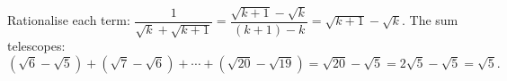 Rationalise each term: $\dfrac{1}{\sqrt k+\sqrt{k+1}}=\dfrac{\sqrt{k+1}-\sqrt k}{(k+1)-k}=\sqrt{k+1}-\sqrt k$. The sum telescopes:
\[\left(\sqrt6-\sqrt5\right)+\left(\sqrt7-\sqrt6\right)+\cdots+\left(\sqrt{20}-\sqrt{19}\right)=\sqrt{20}-\sqrt5=2\sqrt5-\sqrt5=\boxed{\sqrt5}.\]

